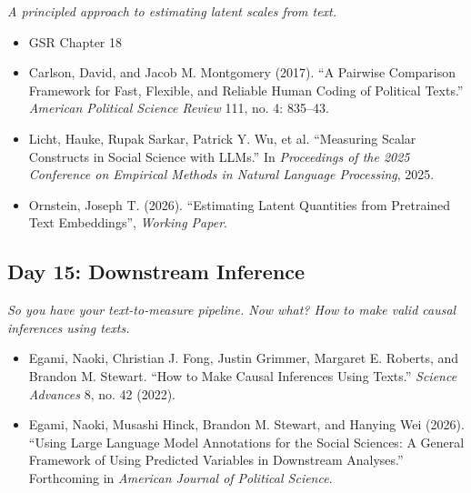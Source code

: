 \documentclass[11pt, letterpaper]{article}
\begin{document}
\textit{A principled approach to estimating latent scales from text.}

\begin{itemize}
	\item GSR Chapter 18
	\item Carlson, David, and Jacob M. Montgomery (2017). ``A Pairwise Comparison Framework for Fast, Flexible, and Reliable Human Coding of Political Texts.'' \textit{American Political Science Review} 111, no. 4: 835–43.
	\item Licht, Hauke, Rupak Sarkar, Patrick Y. Wu, et al. “Measuring Scalar Constructs in Social Science with LLMs.” In \textit{Proceedings of the 2025 Conference on Empirical Methods in Natural Language Processing}, 2025.
	\item Ornstein, Joseph T. (2026). ``Estimating Latent Quantities from Pretrained Text Embeddings'', \textit{Working Paper}.
	
\end{itemize}

\subsection*{Day 15: Downstream Inference}

\textit{So you have your text-to-measure pipeline. Now what? How to make valid causal inferences using texts.}

\begin{itemize}
	\item Egami, Naoki, Christian J. Fong, Justin Grimmer, Margaret E. Roberts, and Brandon M. Stewart. “How to Make Causal Inferences Using Texts.” \textit{Science Advances} 8, no. 42 (2022).
	\item Egami, Naoki, Musashi Hinck, Brandon M. Stewart, and Hanying Wei (2026). ``Using Large Language Model Annotations for the Social Sciences: A General Framework of Using Predicted Variables in Downstream Analyses.'' Forthcoming in \textit{American Journal of Political Science}.
	
	
\end{itemize}

%
\end{document}
